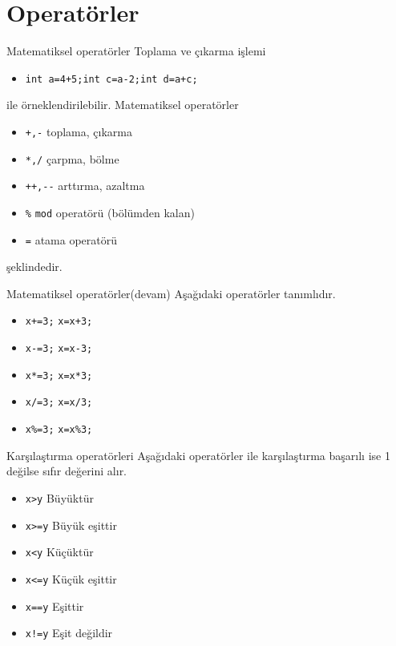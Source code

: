 \section{Operatörler}
\begin{frame}[fragile]{Matematiksel operatörler}
    Toplama ve çıkarma işlemi
    \begin{itemize}
        \item \lstinline{int a=4+5;int c=a-2;int d=a+c;} 
    \end{itemize}
    ile örneklendirilebilir. Matematiksel operatörler
    \begin{itemize}
        \item \lstinline{+,-} toplama, çıkarma 
        \item \lstinline{*,/} çarpma, bölme
        \item \lstinline{++,--} arttırma, azaltma 
        \item \lstinline{%} \verb|mod| operatörü (bölümden kalan)
        \item \lstinline{=} atama operatörü
    \end{itemize}
    şeklindedir.
\end{frame}
\begin{frame}[fragile]{Matematiksel operatörler(devam)}
    Aşağıdaki operatörler tanımlıdır.
    \begin{itemize}
        \item \lstinline{x+=3;} \lstinline{x=x+3;} 
        \item \lstinline{x-=3;} \lstinline{x=x-3;} 
        \item \lstinline{x*=3;} \lstinline{x=x*3;} 
        \item \lstinline{x/=3;} \lstinline{x=x/3;} 
        \item \lstinline{x%=3;} \lstinline{x=x%3;} 
    \end{itemize}
\end{frame}
\begin{frame}[fragile]{Karşılaştırma operatörleri}
    Aşağıdaki operatörler ile karşılaştırma başarılı ise 1 değilse sıfır değerini alır.
    \begin{itemize}
        \item \lstinline{x>y} Büyüktür
        \item \lstinline{x>=y} Büyük eşittir
        \item \lstinline{x<y} Küçüktür
        \item \lstinline{x<=y} Küçük eşittir
        \item \lstinline{x==y} Eşittir
        \item \lstinline{x!=y} Eşit değildir
    \end{itemize}
\end{frame}
